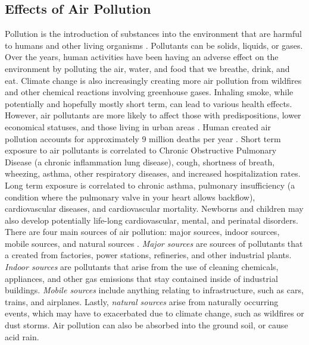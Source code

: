 \subsection{Effects of Air Pollution}
Pollution is the introduction of substances into the environment that are
harmful to humans and other living organisms
\cite{health-impacts-air-pollution-review}. Pollutants can be solids, liquids,
or gases. Over the years, human activities have been having an adverse effect on
the environment by polluting the air, water, and food that we breathe, drink,
and eat. Climate change is also increasingly creating more air pollution from
wildfires and other chemical reactions involving greenhouse gases. Inhaling
smoke, while potentially and hopefully mostly short term, can lead to various
health effects. However, air pollutants are more likely to affect those with
predispositions, lower economical statuses, and those living in
urban areas \cite{socioeconomic-disparities-air-pollution-review}.  Human
created air pollution accounts for approximately 9 million deaths per year
\cite{health-impacts-air-pollution-review}. Short term exposure to air
pollutants is correlated to Chronic Obstructive Pulmonary Disease (a chronic
inflammation lung disease), cough, shortness of breath, wheezing, asthma, other
respiratory diseases, and increased hospitalization rates. Long term exposure
is correlated to chronic asthma, pulmonary insufficiency (a condition where the
pulmonary valve in your heart allows backflow), cardiovascular diseases, and
cardiovascular mortality. Newborns and children may also develop potentially
life-long cardiovascular, mental, and perinatal disorders. There are four 
main sources of air pollution: major sources, indoor sources, mobile sources,
and natural sources \cite{health-impacts-air-pollution-review}. \emph{Major
sources} are sources of pollutants that a created from factories, power
stations, refineries, and other industrial plants. \emph{Indoor sources} are
pollutants that arise from the use of cleaning chemicals, appliances, and other
gas emissions that stay contained inside of industrial buildings. \emph{Mobile
sources} include anything relating to infrastructure, such as cars, trains, and
airplanes. Lastly, \emph{natural sources} arise from naturally occurring
events, which may have to exacerbated due to climate change, such as wildfires
or dust storms. Air pollution can also be absorbed into the ground soil, or
cause acid rain. 


